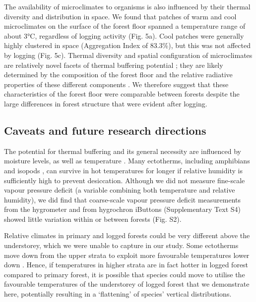\documentclass[12pt,a4paper,]{report}
\theoremstyle{definition}
\theoremstyle{definition}
\theoremstyle{definition}
\theoremstyle{remark}
\begin{document}
The availability of microclimates to organisms is also influenced by
their thermal diversity and distribution in space. We found that patches
of warm and cool microclimates on the surface of the forest floor
spanned a temperature range of about 3°C, regardless of logging activity
(Fig. 5a). Cool patches were generally highly clustered in space
(Aggregation Index of 83.3\%), but this was not affected by logging
(Fig. 5c). Thermal diversity and spatial configuration of microclimates
are relatively novel facets of thermal buffering potential \citep[but
see:][]{caillon_warming2014, sears_configuration2016, faye_toolbox2016};
they are likely determined by the composition of the forest floor and
the relative radiative properties of these different components
\citep[e.g.~bare soil versus leaves versus
water;][]{oke_boundary1987, snyder_analyzing2004}. We therefore suggest
that these characteristics of the forest floor were comparable between
forests despite the large differences in forest structure that were
evident after logging.

\subsection{Caveats and future research
directions}\label{caveats-and-future-research-directions}

The potential for thermal buffering and its general necessity are
influenced by moisture levels, as well as temperature
\citep{mclaughlin_hydrologic2017}. Many ectotherms, including amphibians
\citep{duellman_biology1986} and isopods \citep{hassall_predicting2010},
can survive in hot temperatures for longer if relative humidity is
sufficiently high to prevent desiccation. Although we did not measure
fine-scale vapour pressure deficit (a variable combining both
temperature and relative humidity), we did find that coarse-scale vapour
pressure deficit measurements from the hygrometer and from hygrochron
iButtons (Supplementary Text S4) showed little variation within or
between forests (Fig. S2).

Relative climates in primary and logged forests could be very different
above the understorey, which we were unable to capture in our study.
Some ectotherms move down from the upper strata to exploit more
favourable temperatures lower down \citep{scheffers_increasing2013}.
Hence, if temperatures in higher strata are in fact hotter in logged
forest compared to primary forest, it is possible that species could
move to utilise the favourable temperatures of the understorey of logged
forest that we demonstrate here, potentially resulting in a `flattening'
of species' vertical distributions.
\end{document}
